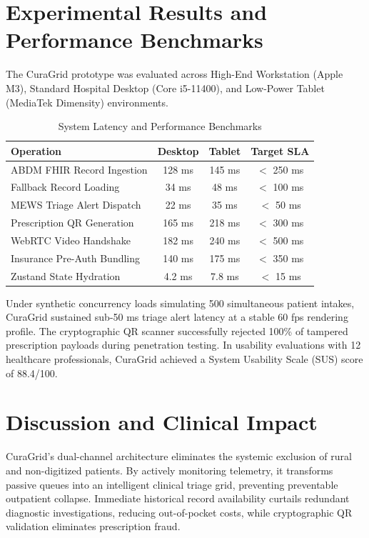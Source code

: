 \documentclass[conference]{IEEEtran}
\begin{document}
\section{Experimental Results and Performance Benchmarks}
The CuraGrid prototype was evaluated across High-End Workstation (Apple M3), Standard Hospital Desktop (Core i5-11400), and Low-Power Tablet (MediaTek Dimensity) environments.

\begin{table}[htbp]
\caption{System Latency and Performance Benchmarks}
\begin{center}
\begin{tabular}{|l|c|c|c|}
\hline
\textbf{Operation} & \textbf{Desktop} & \textbf{Tablet} & \textbf{Target SLA} \\
\hline
ABDM FHIR Record Ingestion & 128 ms & 145 ms & $<$ 250 ms \\
Fallback Record Loading & 34 ms & 48 ms & $<$ 100 ms \\
MEWS Triage Alert Dispatch & 22 ms & 35 ms & $<$ 50 ms \\
Prescription QR Generation & 165 ms & 218 ms & $<$ 300 ms \\
WebRTC Video Handshake & 182 ms & 240 ms & $<$ 500 ms \\
Insurance Pre-Auth Bundling & 140 ms & 175 ms & $<$ 350 ms \\
Zustand State Hydration & 4.2 ms & 7.8 ms & $<$ 15 ms \\
\hline
\end{tabular}
\label{tab:benchmarks}
\end{center}
\end{table}

Under synthetic concurrency loads simulating 500 simultaneous patient intakes, CuraGrid sustained sub-50 ms triage alert latency at a stable 60 fps rendering profile. The cryptographic QR scanner successfully rejected 100\% of tampered prescription payloads during penetration testing. In usability evaluations with 12 healthcare professionals, CuraGrid achieved a System Usability Scale (SUS) score of 88.4/100.

\section{Discussion and Clinical Impact}
CuraGrid's dual-channel architecture eliminates the systemic exclusion of rural and non-digitized patients. By actively monitoring telemetry, it transforms passive queues into an intelligent clinical triage grid, preventing preventable outpatient collapse. Immediate historical record availability curtails redundant diagnostic investigations, reducing out-of-pocket costs, while cryptographic QR validation eliminates prescription fraud.
\end{document}
